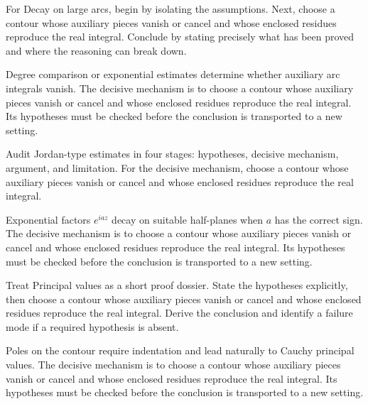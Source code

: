 \begin{problem}\label{prob:iv11-problem-03}
For Decay on large arcs, begin by isolating the assumptions. Next, choose a contour whose auxiliary pieces vanish or cancel and whose enclosed residues reproduce the real integral. Conclude by stating precisely what has been proved and where the reasoning can break down.
\end{problem}
\begin{solution}
Degree comparison or exponential estimates determine whether auxiliary arc integrals vanish. The decisive mechanism is to choose a contour whose auxiliary pieces vanish or cancel and whose enclosed residues reproduce the real integral. Its hypotheses must be checked before the conclusion is transported to a new setting.
\end{solution}

\begin{problem}\label{prob:iv11-problem-04}
Audit Jordan-type estimates in four stages: hypotheses, decisive mechanism, argument, and limitation. For the decisive mechanism, choose a contour whose auxiliary pieces vanish or cancel and whose enclosed residues reproduce the real integral.
\end{problem}
\begin{solution}
Exponential factors $e^{iaz}$ decay on suitable half-planes when $a$ has the correct sign. The decisive mechanism is to choose a contour whose auxiliary pieces vanish or cancel and whose enclosed residues reproduce the real integral. Its hypotheses must be checked before the conclusion is transported to a new setting.
\end{solution}

\begin{problem}\label{prob:iv11-problem-05}
Treat Principal values as a short proof dossier. State the hypotheses explicitly, then choose a contour whose auxiliary pieces vanish or cancel and whose enclosed residues reproduce the real integral. Derive the conclusion and identify a failure mode if a required hypothesis is absent.
\end{problem}
\begin{solution}
Poles on the contour require indentation and lead naturally to Cauchy principal values. The decisive mechanism is to choose a contour whose auxiliary pieces vanish or cancel and whose enclosed residues reproduce the real integral. Its hypotheses must be checked before the conclusion is transported to a new setting.
\end{solution}

